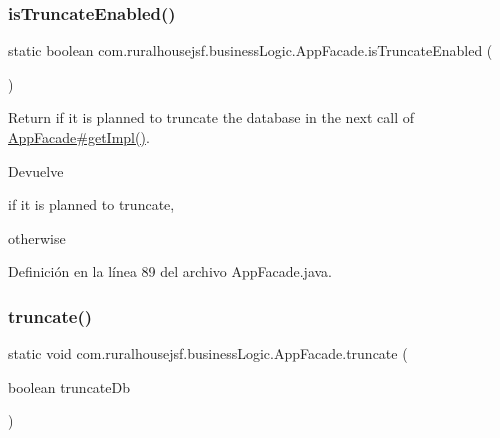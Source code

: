 \mbox{\label{classcom_1_1ruralhousejsf_1_1business_logic_1_1_app_facade_a3638d881ea2d917df632a313d9ed9b20}} 
\subsubsection{\texorpdfstring{isTruncateEnabled()}{isTruncateEnabled()}}
{\footnotesize\ttfamily static boolean com.\+ruralhousejsf.\+business\+Logic.\+App\+Facade.\+is\+Truncate\+Enabled (\begin{DoxyParamCaption}{ }\end{DoxyParamCaption})\hspace{0.3cm}{\ttfamily [static]}}

Return if it is planned to truncate the database in the next call of \mbox{\hyperlink{classcom_1_1ruralhousejsf_1_1business_logic_1_1_app_facade_a029bcceee98b9070b9f80abc54db45d6}{App\+Facade\#get\+Impl()}}.

\begin{DoxyReturn}{Devuelve}

\begin{DoxyCode}{0}
\DoxyCodeLine{\textcolor{keyword}{true} }
\end{DoxyCode}
 if it is planned to truncate,
\begin{DoxyCode}{0}
\DoxyCodeLine{\textcolor{keyword}{false} }
\end{DoxyCode}
 otherwise 
\end{DoxyReturn}


Definición en la línea 89 del archivo App\+Facade.\+java.

\mbox{\label{classcom_1_1ruralhousejsf_1_1business_logic_1_1_app_facade_a98aed1ed8a03c6a92e15121fed4eb452}} 
\subsubsection{\texorpdfstring{truncate()}{truncate()}}
{\footnotesize\ttfamily static void com.\+ruralhousejsf.\+business\+Logic.\+App\+Facade.\+truncate (\begin{DoxyParamCaption}\item[{boolean}]{truncate\+Db }\end{DoxyParamCaption})\hspace{0.3cm}{\ttfamily [static]}}

